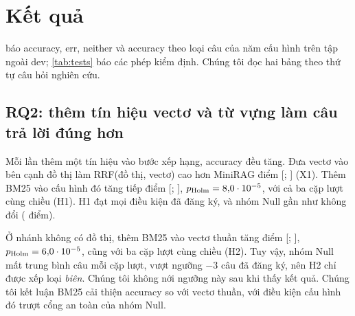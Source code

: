 \section{Kết quả}\label{sec:results}

 báo accuracy, err, neither và accuracy theo loại câu của năm cấu hình trên tập ngoài dev; \cref{tab:tests} báo các phép kiểm định.
Chúng tôi đọc hai bảng theo thứ tự câu hỏi nghiên cứu.

\begin{table}[t]\centering
\caption{Kết quả hỏi đáp trên \nHeld{} câu ngoài dev của LiHua-World (Qwen2.5-3B; giám khảo \texttt{gemini-flash-lite-latest}, lượt chấm 1; $\budget = 4000$ token). acc, err, neither là trung bình qua các lượt sinh; $\pm$ là độ lệch chuẩn giữa các lượt sinh. Cột Single/Multi/Null là acc của từng nhóm, số trong ngoặc là số câu. Dòng in nghiêng lấy từ bài gốc, với giám khảo và đồ thị khác, chỉ dùng để tham chiếu.}
\label{tab:main}
\small
\resizebox{\linewidth}{!}{}
\end{table}

\begin{table}[t]\centering
\caption{Kiểm định ghép cặp trên \nHeld{} câu ngoài dev. $\Delta$acc là hiệu accuracy trung bình theo câu (điểm phần trăm), kèm KTC 95\% bootstrap ghép cặp. $p$ từ hoán vị đổi dấu (100.000 lần; $p$ nhỏ nhất đo được là $10^{-5}$), hiệu chỉnh Holm trong từng họ. ``Lên/xuống'' là số câu sai$\to$đúng / đúng$\to$sai của từng cặp lượt sinh. ``Null net'' là số câu Null thay đổi trung bình mỗi cặp lượt (âm là kém đi).}
\label{tab:tests}
\footnotesize
\resizebox{\linewidth}{!}{}
\end{table}

\subsection{RQ2: thêm tín hiệu vectơ và từ vựng làm câu trả lời đúng hơn}\label{sec:rq2}
Mỗi lần thêm một tín hiệu vào bước xếp hạng, accuracy đều tăng.
Đưa vectơ vào bên cạnh đồ thị làm RRF(đồ thị, vectơ) cao hơn MiniRAG \diffXA{} điểm [\ciLoXA; \ciHiXA] (X1).
Thêm BM25 vào cấu hình đó tăng tiếp \diffHA{} điểm [\ciLoHA; \ciHiHA], $p_{\text{Holm}} = 8{,}0\cdot 10^{-5}$, với cả ba cặp lượt cùng chiều (H1).
H1 đạt mọi điều kiện đã đăng ký, và nhóm Null gần như không đổi (\diffHANull{} điểm).

Ở nhánh không có đồ thị, thêm BM25 vào vectơ thuần tăng \diffHB{} điểm [\ciLoHB; \ciHiHB], $p_{\text{Holm}} = 6{,}0\cdot 10^{-5}$, cũng với ba cặp lượt cùng chiều (H2).
Tuy vậy, nhóm Null mất trung bình \nullNetHB{} câu mỗi cặp lượt, vượt ngưỡng $-3$ câu đã đăng ký, nên H2 chỉ được xếp loại \emph{biên}.
Chúng tôi không nới ngưỡng này sau khi thấy kết quả.
Chúng tôi kết luận BM25 cải thiện accuracy so với vectơ thuần, với điều kiện cấu hình đó trượt cổng an toàn của nhóm Null.

